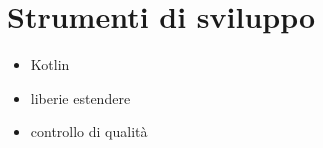 



\section{Strumenti di sviluppo}

\begin{itemize}
	\item Kotlin
	\item liberie estendere
	\item controllo di qualità
\end{itemize}
